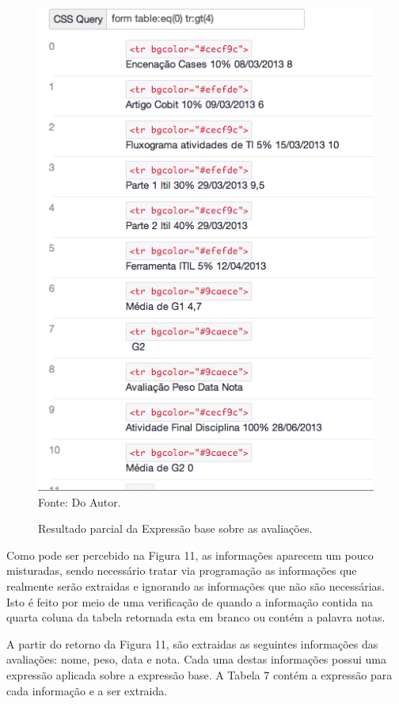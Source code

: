 \begin{figure}[!htb]
     \centering
     \caption[Extração de Informações - Resultado parcial Avaliações]{Resultado parcial da Expressão base sobre as avaliações.}
     \includegraphics[scale=0.5]{imagens/avaliacoesdisciplinas1.png}
     \\  Fonte: Do Autor.
\end{figure}

Como pode ser percebido na Figura 11, as informações aparecem um pouco misturadas, sendo necessário tratar via programação as informações que realmente serão extraidas e ignorando as informações que não são necessárias. Isto é feito por meio de uma verificação de quando a informação contida na quarta coluna da tabela retornada esta em branco ou contém a palavra notas.

A partir do retorno da Figura 11, são extraidas as seguintes informações das avaliações: nome, peso, data e nota. Cada uma destas informações possui uma expressão aplicada sobre a expressão base. A Tabela 7 contém a expressão para cada informação e a ser extraida.

